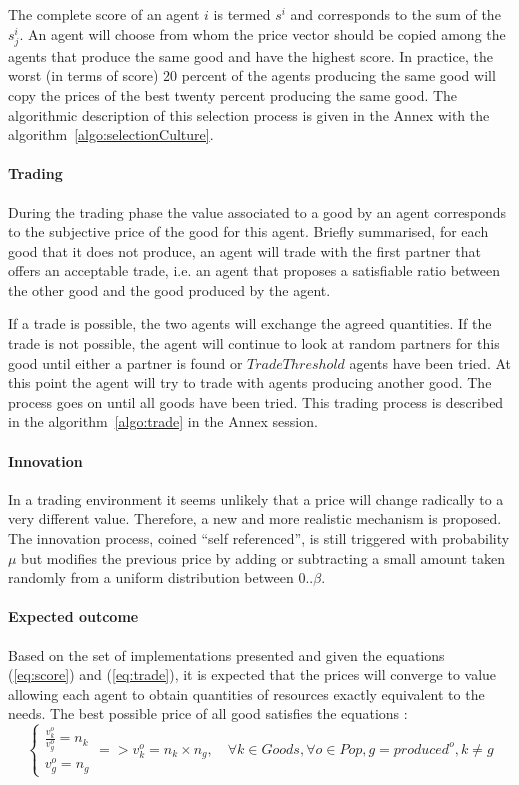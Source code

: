 \documentclass[a4paper]{article}
\begin{document}
The complete score of an agent $i$ is termed $s^i$ and corresponds to the sum of the $s^i_j$. An agent will choose from whom the price vector should be copied among the agents that produce the same good and have the highest score. In practice, the worst (in terms of score) 20 percent of the agents producing the same good will copy the prices of the best twenty percent producing the same good. The algorithmic description of this selection process is given in the Annex with the algorithm~\ref{algo:selectionCulture}.


\paragraph{Trading} 
During the trading phase the value associated to a good by an agent corresponds to the subjective price of the good for this agent. Briefly summarised, for each good that it does not produce, an agent will trade with the first partner that offers an acceptable trade, i.e. an agent that proposes a satisfiable ratio between the other good and the good produced by the agent. 

If a trade is possible, the two agents will exchange the agreed quantities. If the trade is not possible, the agent will continue to look at random partners for this good until either a partner is found or $TradeThreshold$ agents have been tried. At this point the agent will try to trade with agents producing another good. The process goes on until all goods have been tried. This trading process is described in the algorithm~\ref{algo:trade} in the Annex session.



\paragraph{Innovation} In a trading environment it seems unlikely that a price will change radically to a very different value. Therefore, a new and more realistic mechanism is proposed. The innovation process, coined ``self referenced'', is still triggered with probability $\mu$ 
but modifies the previous price by adding or subtracting a small amount taken randomly from a uniform  distribution between $0 .. \beta$.


\paragraph{Expected outcome} Based on the set of implementations presented and given the equations (\ref{eq:score}) and (\ref{eq:trade}), it is expected that the prices will converge to value allowing each agent to obtain quantities of resources exactly equivalent to the needs. The best possible price of all good satisfies the equations :
\begin{equation}
	\begin{cases}
		\frac{v^o_k}{v^o_g} = n_k \\
		v^o_g = n_g 
	\end{cases} =>v^o_k = n_k \times n_g, \quad \forall k \in Goods, \forall o \in Pop, g = produced^o, k \not= g 
\end{equation}
\end{document}
